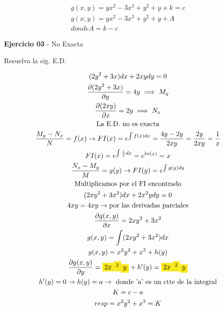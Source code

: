 \documentclass{article}
\begin{document}
\begin{gather*}
g(x,y) = yx^{2}-3x^{3} + y^{2}+y + k = c \\
g(x,y) = yx^{2}-3x^{3} + y^{2}+y +A \\
donde A = k-c
\end{gather*}




\textbf{Ejercicio 03} - No Exacta

Resuelva la sig. E.D.


\begin{gather*}
(2y^{2}+3x)dx + 2xydy = 0 \\
\frac{\partial (2y^{2}+3x)}{\partial y} = 4y \implies  M_{y} \\
\frac{\partial (2xy)}{\partial x} = 2y \implies  N_{x} \\
\text{La E.D. no es exacta} \\
\frac{M_{y}-N_{x}}{N} = f(x)  \rightarrow  FI(x) = e^{\int f(x)dx} = \frac{4y-2y}{2xy} =\frac{2y}{2xy}=\frac{1}{x} \\
FI(x) = e^{\int \frac{1}{x}dx} = e^{ln(x)} = x \\
\frac{N_{x}-M_{y}}{M} = g(y)  \rightarrow  FI(y) = e^{\int g(y)dy} \\
\text{Multiplicamos por el FI encontrado} \\
(2xy^{2}+3x^{2})dx + 2x^{2}ydy = 0 \\
4xy = 4xy  \rightarrow \text{por las derivadas parciales} \\
\frac{\partial g(x,y)}{\partial x} =2xy^{2}+3x^{2} \\
g(x,y) = \int  (2xy^{2}+3x^{2})dx \\
g(x,y) = x^{2}y^{2}+x^{3} + h(y) \\
\frac{\partial g(x,y)}{\partial y} = \text{\colorbox[RGB]{248,231,28}{$2x$}}\text{\colorbox[RGB]{248,231,28}{$^{2}$}}\text{\colorbox[RGB]{248,231,28}{$y$}}+ h'(y) =\text{\colorbox[RGB]{248,231,28}{$2x$}}\text{\colorbox[RGB]{248,231,28}{$^{2}$}}\text{\colorbox[RGB]{248,231,28}{$y$}} \\
h'(y)=0  \rightarrow h(y) = a  \rightarrow \text{ donde 'a' es un ctte de la integral} \\
K= c-a \\
resp = x^{2}y^{2}+x^{3} = K
\end{gather*}
\end{document}
